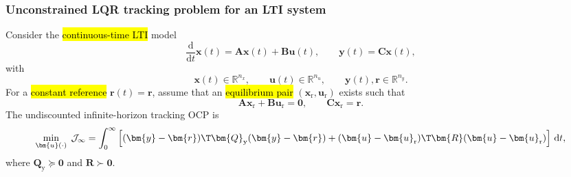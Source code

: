 \begin{frame}
	\frametitle{Unconstrained LQR tracking problem for an LTI system}
	Consider the \hl{continuous-time LTI} model
	\begin{equation}
		\frac{\mathrm{d}}{\mathrm{d}t}\bm{x}(t)=\bm{A}\bm{x}(t)+\bm{B}\bm{u}(t),
		\qquad
		\bm{y}(t)=\bm{C}\bm{x}(t),
	\end{equation}\pause%
	with
	\begin{equation}
		\bm{x}(t)\in\mathbb{R}^{n_x},
		\qquad
		\bm{u}(t)\in\mathbb{R}^{n_u},
		\qquad
		\bm{y}(t),\bm{r}\in\mathbb{R}^{n_y}.
	\end{equation}\pause%
	For a \hl{constant reference} $\bm{r}(t)=\bm{r}$, assume that an \hl{equilibrium pair} $(\bm{x}_{\mathrm{r}},\bm{u}_{\mathrm{r}})$ exists such that
	\begin{equation}
		\bm{A}\bm{x}_{\mathrm{r}}+\bm{B}\bm{u}_{\mathrm{r}}=\bm{0},
		\qquad
		\bm{C}\bm{x}_{\mathrm{r}}=\bm{r}.
	\end{equation}\pause%
	The undiscounted infinite-horizon tracking OCP is
	\begin{equation}
		\min_{\bm{u}(\cdot)}\; \mathcal{J}_\infty
		=\int_0^{\infty}
		\left[(\bm{y}-\bm{r})\T\bm{Q}_{\mathrm{y}}(\bm{y}-\bm{r})
			+(\bm{u}-\bm{u}_{\mathrm{r}})\T\bm{R}(\bm{u}-\bm{u}_{\mathrm{r}})\right]\,\mathrm{d}t,
	\end{equation}
	where $\bm{Q}_{\mathrm{y}}\succeq \bm{0}$ and $\bm{R}\succ \bm{0}$.
\end{frame}

